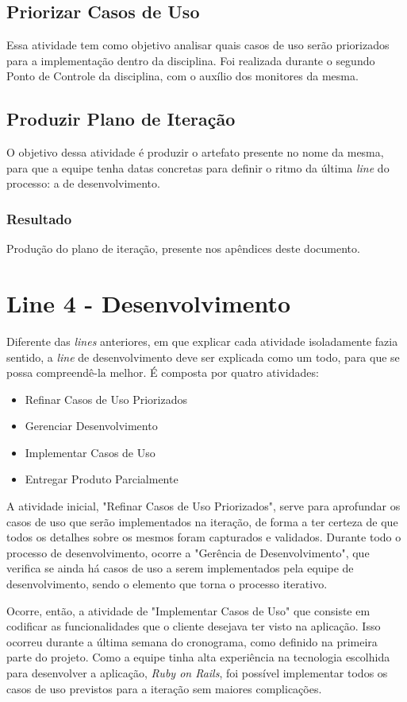 \subsection{Priorizar Casos de Uso}
Essa atividade tem como objetivo analisar quais casos de uso serão priorizados para a implementação dentro da disciplina. Foi realizada durante o segundo Ponto de Controle da disciplina, com o auxílio dos monitores da mesma.

\subsection{Produzir Plano de Iteração}
O objetivo dessa atividade é produzir o artefato presente no nome da mesma, para que a equipe tenha datas concretas para definir o ritmo da última \textit{line} do processo: a de desenvolvimento.

\subsubsection{Resultado}
Produção do plano de iteração, presente nos apêndices deste documento.

\section{Line 4 - Desenvolvimento}
Diferente das \textit{lines} anteriores, em que explicar cada atividade isoladamente fazia sentido, a \textit{line} de desenvolvimento deve ser explicada como um todo, para que se possa compreendê-la melhor. É composta por quatro atividades:
\begin{itemize}
\item Refinar Casos de Uso Priorizados
\item Gerenciar Desenvolvimento
\item Implementar Casos de Uso
\item Entregar Produto Parcialmente
\end{itemize}

A atividade inicial, "Refinar Casos de Uso Priorizados", serve para aprofundar os casos de uso que serão implementados na iteração, de forma a ter certeza de que todos os detalhes sobre os mesmos foram capturados e validados. Durante todo o processo de desenvolvimento, ocorre a "Gerência de Desenvolvimento", que verifica se ainda há casos de uso a serem implementados pela equipe de desenvolvimento, sendo o elemento que torna o processo iterativo.

Ocorre, então, a atividade de "Implementar Casos de Uso" que consiste em codificar as funcionalidades que o cliente desejava ter visto na aplicação. Isso ocorreu durante a última semana do cronograma, como definido na primeira parte do projeto.  Como a equipe tinha alta experiência na tecnologia escolhida para desenvolver a aplicação, \textit{Ruby on Rails}, foi possível implementar todos os casos de uso previstos para a iteração sem maiores complicações.

